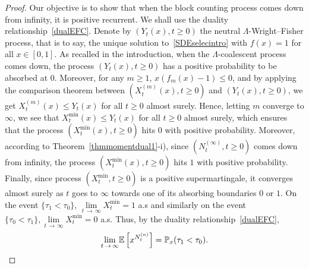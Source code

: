 \documentclass[10pt]{amsart}
\theoremstyle{definition}\newtheorem{defi}[theo]{Definition}\newtheorem{rema}[theo]{Remark}\newtheorem{exam}[theo]{Example}\newtheorem{exem}[theo]{Example}\newtheorem{nota}[theo]{Notation}
\newcommand{\bbE}{\mathbb{E}}
\newcommand{\bbP}{\mathbb{P}}
\begin{document}
\begin{proof}
 Our objective is to show that when the block counting process comes down from infinity, it is positive recurrent. We shall use the duality relationship~\eqref{dualEFC}. Denote by $(Y_t(x),t\geq 0)$ the neutral $\Lambda$-Wright--Fisher process, that is to say, the unique solution to~\eqref{SDEselecintro} with $f(x)=1$ for all $x\in [0,1]$. As recalled in the introduction, when the $\Lambda$-coalescent process comes down, the process $(Y_t(x),t\geq 0)$ has a positive probability to be absorbed at $0$. Moreover, for any $m\geq 1$, $x(f_m(x)-1)\leq 0$, and by applying the comparison theorem between $(X_t^{(m)}(x),t\geq 0)$ and $(Y_t(x),t\geq 0)$, we get $X_t^{(m)}(x)\leq Y_t(x)$ for all $t\geq 0$ almost surely. Hence, letting $m$ converge to $\infty$, we see that $X^{\min}_t(x)\leq Y_t(x)$ for all $t\geq 0$ almost surely, which ensures that the process $(X^{\min}_t(x),t\geq 0)$ hits $0$ with positive probability. Moreover, according to Theorem~\ref{thmmomentdual1}-i), since $(N_t^{(\infty)},t\geq 0)$ comes down from infinity, the process $(X^{\min}_t(x),t\geq 0)$ hits $1$ with positive probability. Finally, since process $(X_t^{\min},t\geq 0)$ is a positive supermartingale, it converges almost surely as $t$ goes to $\infty$ towards one of its absorbing boundaries $0$ or $1$. On the event $\{\tau_1<\tau_0\}$, $\underset{t\,\rightarrow\,\infty}{\lim} X_t^{\min}=1$ a.s and similarly on the event 
$
\{\tau_0<\tau_1\}, \underset{t\,\rightarrow \,\infty}{\lim} X_t^{\min}=0
$
a.s. Thus, by the duality relationship~\eqref{dualEFC},
\[ 
\underset{t\,\rightarrow\,\infty}{\lim} \bbE\left[x^{N_t^{(n)}}\right]=\bbP_x(\tau_1<\tau_0).\qedhere
\]
\end{proof}
\end{document}
